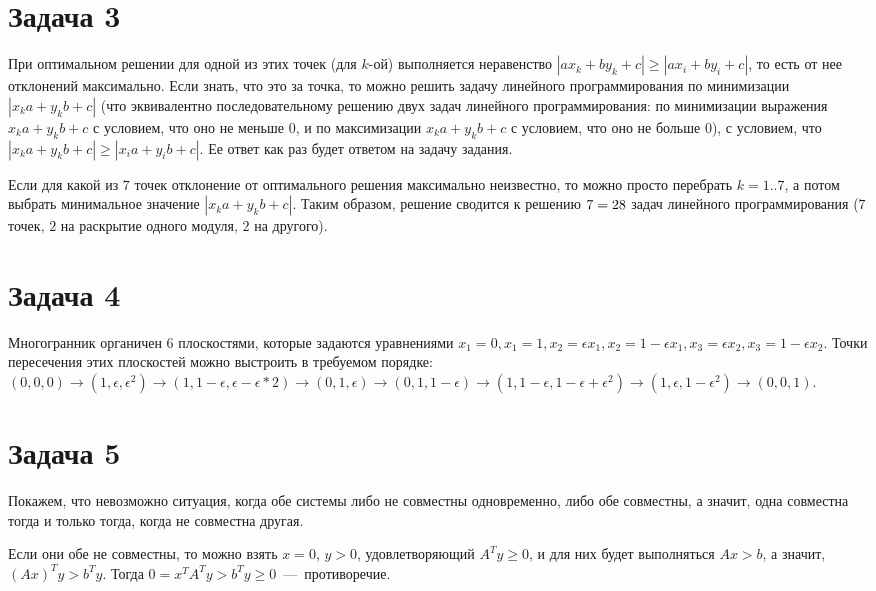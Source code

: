 \documentclass[a4paper,12pt]{article} %
\begin{document}
\section{Задача 3}
\hspace{5mm}
При оптимальном решении для одной из этих точек (для $k$-ой) выполняется неравенство $|ax_k+by_k+c|\geq|ax_i+by_i+c|$, то есть от нее отклонений максимально. Если знать, что это за точка, то можно решить задачу линейного программирования по минимизации $|x_ka+y_kb+c|$ (что эквивалентно последовательному решению двух задач линейного программирования: по минимизации выражения $x_ka+y_kb+c$ с условием, что оно не меньше $0$, и по максимизации $x_ka+y_kb+c$ с условием, что оно не больше $0$), с условием, что $|x_ka+y_kb+c|\geq|x_ia+y_ib+c|$. Ее ответ как раз будет ответом на задачу задания. 

Если для какой из $7$ точек отклонение от оптимального решения максимально неизвестно, то можно просто перебрать $k=1..7$, а потом выбрать минимальное значение $|x_ka+y_kb+c|$. Таким образом, решение сводится к решению $7\time 2\time 2 = 28$ задач линейного программирования ($7$ точек, $2$ на раскрытие одного модуля, $2$ на другого).

\section{Задача 4}
\hspace{5mm}
Многогранник органичен $6$ плоскостями, которые задаются уравнениями $x_1=0, x_1=1, x_2=\epsilon x_1, x_2 = 1-\epsilon x_1, x_3=\epsilon x_2, x_3 = 1-\epsilon x_2$. Точки пересечения этих плоскостей можно выстроить в требуемом порядке: $(0,0,0)\rightarrow(1,\epsilon,\epsilon^2)\rightarrow(1,1-\epsilon,\epsilon-\epsilon*2)\rightarrow(0,1,\epsilon)\rightarrow(0,1,1-\epsilon)\rightarrow(1,1-\epsilon,1-\epsilon+\epsilon^2)\rightarrow(1,\epsilon,1-\epsilon^2)\rightarrow(0,0,1)$.

\section{Задача 5}
\hspace{5mm}
Покажем, что невозможно ситуация, когда обе системы либо не совместны одновременно, либо обе совместны, а значит, одна совместна тогда и только тогда, когда не совместна другая.

Если они обе не совместны, то можно взять $x=0$, $y>0$, удовлетворяющий $A^Ty\geq0$, и для них будет выполняться $Ax>b$, а значит, $(Ax)^Ty>b^Ty$. Тогда $0=x^TA^Ty>b^Ty\geq0$~---~противоречие.
\end{document}
